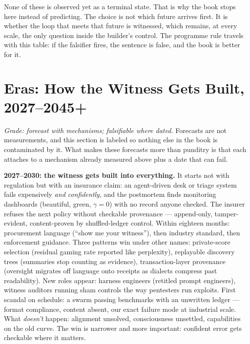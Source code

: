 None of these is observed yet as a terminal state. That is why the book stops here instead of predicting. The choice is not which future arrives first. It is whether the loop that meets that future is witnessed, which remains, at every scale, the only question inside the builder's control. The programme rule travels with this table: if the falsifier fires, the sentence is false, and the book is better for it.

\section{Eras: How the Witness Gets Built, 2027--2045+}
\label{sec:ch10-eras}

\textit{Grade: forecast with mechanisms; falsifiable where dated.} Forecasts are not measurements, and this section is labeled so nothing else in the book is contaminated by it. What makes these forecasts more than punditry is that each attaches to a mechanism already measured above plus a date that can fail.

\textbf{2027--2030: the witness gets built into everything.} It starts not with regulation but with an insurance claim: an agent-driven desk or triage system fails expensively \textit{and confidently}, and the postmortem finds monitoring dashboards (beautiful, green, $\gamma=0$) with no record anyone checked. The insurer refuses the next policy without checkable provenance --- append-only, tamper-evident, content-proven by shuffled-ledger control. Within eighteen months: procurement language (``show me your witness''), then industry standard, then enforcement guidance. Three patterns win under other names: private-score selection (residual gaming rate reported like perplexity), replayable discovery trees (summaries stop counting as evidence), transaction-layer provenance (oversight migrates off language onto receipts as dialects compress past readability). New roles appear: harness engineers (retitled prompt engineers), witness auditors running sham controls the way pentesters run exploits. First scandal on schedule: a swarm passing benchmarks with an unwritten ledger --- format compliance, content absent, our exact failure mode at industrial scale. What \textit{doesn't} happen: alignment unsolved, consciousness unsettled, capabilities on the old curve. The win is narrower and more important: confident error gets checkable where it matters.


